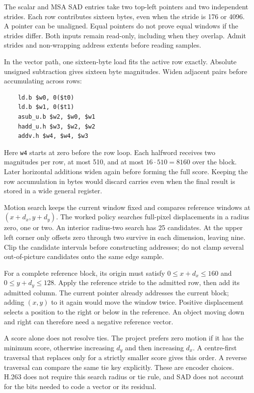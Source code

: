 The scalar and MSA SAD entries take two top-left pointers and two independent
strides. Each row contributes sixteen bytes, even when the stride is 176 or
4096. A pointer can be unaligned. Equal pointers do not prove equal windows if
the strides differ. Both inputs remain read-only, including when they overlap.
Admit strides and non-wrapping address extents before reading samples.

In the vector path, one sixteen-byte load fits the active row exactly. Absolute
unsigned subtraction gives sixteen byte magnitudes. Widen adjacent pairs before
accumulating across rows:
\begin{verbatim}
    ld.b $w0, 0($t0)
    ld.b $w1, 0($t1)
    asub_u.b $w2, $w0, $w1
    hadd_u.h $w3, $w2, $w2
    addv.h $w4, $w4, $w3
\end{verbatim}
Here \texttt{w4} starts at zero before the row loop. Each halfword receives two
magnitudes per row, at most 510, and at most $16\cdot510=8160$ over the block.
Later horizontal additions widen again before forming the full score. Keeping
the row accumulation in bytes would discard carries even when the final result
is stored in a wide general register.

Motion search keeps the current window fixed and compares reference windows at
$(x+d_x,y+d_y)$. The worked policy searches full-pixel displacements in a radius
zero, one or two. An interior radius-two search has 25 candidates. At the upper
left corner only offsets zero through two survive in each dimension, leaving
nine. Clip the candidate intervals before constructing addresses; do not clamp
several out-of-picture candidates onto the same edge sample.

For a complete reference block, its origin must satisfy
$0\leq x+d_x\leq160$ and $0\leq y+d_y\leq128$. Apply the reference stride to the
admitted row, then add its admitted column. The current pointer already addresses
the current block; adding $(x,y)$ to it again would move the window twice.
Positive displacement selects a position to the right or below in the reference.
An object moving down and right can therefore need a negative reference vector.

A score alone does not resolve ties. The project prefers zero motion if it has
the minimum score, otherwise increasing $d_y$ and then increasing $d_x$.
A centre-first traversal that replaces only for a strictly smaller score gives
this order. A reverse traversal can compare the same tie key explicitly.
These are encoder choices. H.263 does not require this search radius or tie rule,
and SAD does not account for the bits needed to code a vector or its residual.

